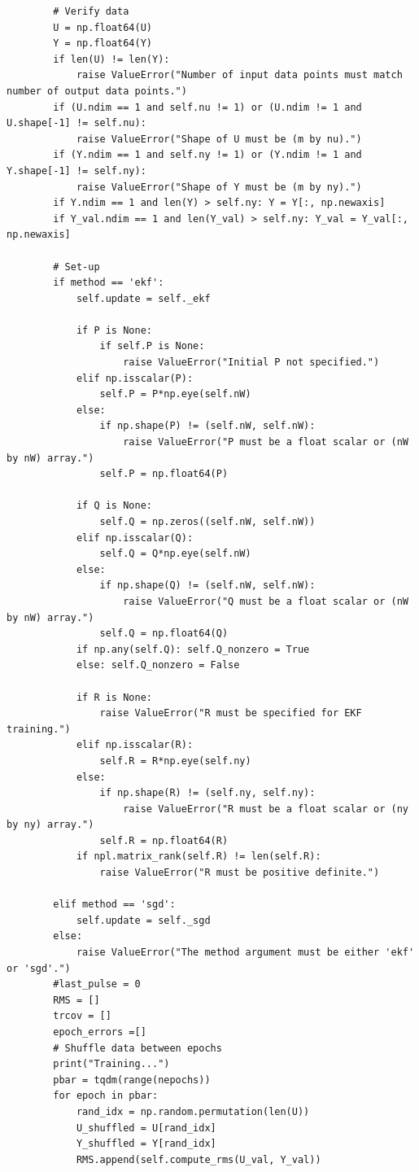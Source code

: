 \documentclass{article}
\begin{document}
\begin{verbatim}
        # Verify data
        U = np.float64(U)
        Y = np.float64(Y)
        if len(U) != len(Y):
            raise ValueError("Number of input data points must match number of output data points.")
        if (U.ndim == 1 and self.nu != 1) or (U.ndim != 1 and U.shape[-1] != self.nu):
            raise ValueError("Shape of U must be (m by nu).")
        if (Y.ndim == 1 and self.ny != 1) or (Y.ndim != 1 and Y.shape[-1] != self.ny):
            raise ValueError("Shape of Y must be (m by ny).")
        if Y.ndim == 1 and len(Y) > self.ny: Y = Y[:, np.newaxis]
        if Y_val.ndim == 1 and len(Y_val) > self.ny: Y_val = Y_val[:, np.newaxis]

        # Set-up
        if method == 'ekf':
            self.update = self._ekf

            if P is None:
                if self.P is None:
                    raise ValueError("Initial P not specified.")
            elif np.isscalar(P):
                self.P = P*np.eye(self.nW)
            else:
                if np.shape(P) != (self.nW, self.nW):
                    raise ValueError("P must be a float scalar or (nW by nW) array.")
                self.P = np.float64(P)

            if Q is None:
                self.Q = np.zeros((self.nW, self.nW))
            elif np.isscalar(Q):
                self.Q = Q*np.eye(self.nW)
            else:
                if np.shape(Q) != (self.nW, self.nW):
                    raise ValueError("Q must be a float scalar or (nW by nW) array.")
                self.Q = np.float64(Q)
            if np.any(self.Q): self.Q_nonzero = True
            else: self.Q_nonzero = False

            if R is None:
                raise ValueError("R must be specified for EKF training.")
            elif np.isscalar(R):
                self.R = R*np.eye(self.ny)
            else:
                if np.shape(R) != (self.ny, self.ny):
                    raise ValueError("R must be a float scalar or (ny by ny) array.")
                self.R = np.float64(R)
            if npl.matrix_rank(self.R) != len(self.R):
                raise ValueError("R must be positive definite.")

        elif method == 'sgd':
            self.update = self._sgd
        else:
            raise ValueError("The method argument must be either 'ekf' or 'sgd'.")
        #last_pulse = 0
        RMS = []
        trcov = []
        epoch_errors =[]
        # Shuffle data between epochs
        print("Training...")
        pbar = tqdm(range(nepochs))
        for epoch in pbar:
            rand_idx = np.random.permutation(len(U))
            U_shuffled = U[rand_idx]
            Y_shuffled = Y[rand_idx]
            RMS.append(self.compute_rms(U_val, Y_val))
            

\end{verbatim}
\end{document}
